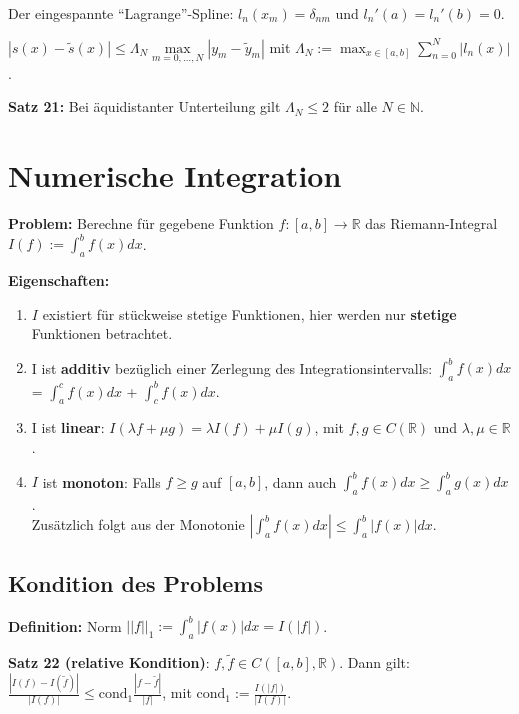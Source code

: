 \documentclass[a4paper]{article}
\begin{document}
Der eingespannte \enquote{Lagrange}-Spline: $l_n(x_m) = \delta_{nm}$ und
$l_n'(a) = l_n'(b) = 0$.

\vspace{1em}

$|s(x) - \tilde{s}(x)| \le \Lambda_N \max\limits_{m = 0, \dots, N} |y_m -
\tilde{y}_m|$ mit $\Lambda_N := \max_{x \in [a, b]} \sum_{n = 0}^N |l_n(x)|$.

\vspace{1em}

\textbf{Satz 21:} Bei äquidistanter Unterteilung gilt $\Lambda_N \le 2$ für alle
$N \in \mathbb{N}$.

\section{Numerische Integration}

\textbf{Problem:} Berechne für gegebene Funktion $f: [a, b] \to \mathbb{R}$ das
Riemann-Integral $I(f) := \int_a^b f(x) dx$.

\textbf{Eigenschaften:}
\begin{enumerate}
    \item $I$ existiert für stückweise stetige Funktionen, hier werden nur
    \textbf{stetige} Funktionen betrachtet.
    \item I ist \textbf{additiv} bezüglich einer Zerlegung des
    Integrationsintervalls: $\int_a^b f(x) dx$ = $\int_a^c f(x) dx$ + $\int_c^b
    f(x) dx$.
    \item I ist \textbf{linear}:
    $I(\lambda f + \mu g) = \lambda I(f) + \mu I(g)$, mit $f, g \in
    C(\mathbb{R})$ und $\lambda, \mu \in \mathbb{R}$.
    \item $I$ ist \textbf{monoton}: Falls $f \ge g$ auf $[a, b]$, dann auch
    $\int_a^b f(x) dx \ge \int_a^b g(x) dx$.
    \\
    Zusätzlich folgt aus der Monotonie
    $|\int_a^b f(x) dx| \le \int_a^b |f(x)| dx$.
\end{enumerate}

\subsection{Kondition des Problems}

\textbf{Definition:} Norm $||f||_1 := \int_a^b |f(x)| dx = I(|f|)$.

\textbf{Satz 22 (relative Kondition)}: $f, \tilde{f} \in C([a, b], \mathbb{R})$.
Dann gilt: $\frac{|I(f) - I(\tilde{f})|}{|I(f)|} \le \mathrm{cond}_1 \frac{|f -
\tilde{f}|}{|f|}$, mit $\mathrm{cond}_1 := \frac{I(|f|)}{|I(f)|}$.
\end{document}
